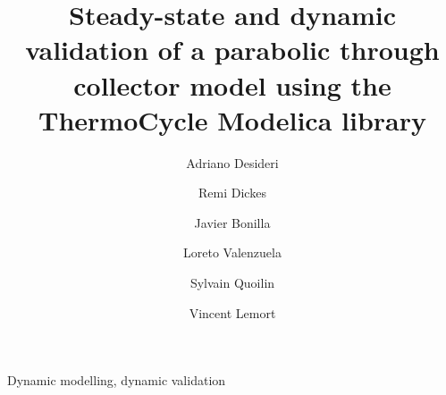 \documentclass[final,3p,times,review]{elsarticle}
\begin{document}
\linenumbers
\modulolinenumbers[1]
\begin{frontmatter}



\title{Steady-state and dynamic validation of a parabolic through collector model using the ThermoCycle Modelica library}


\author[rvt]{Adriano Desideri}
\author[rvt]{Remi Dickes}
\author[focal]{Javier Bonilla}
\author[focal]{Loreto Valenzuela}
\author[rvt]{Sylvain Quoilin}
\author[rvt]{Vincent Lemort}
\address[rvt]{Thermodynamics laboratory, University of Li\`ege,
Campus du Sart Tilman, B49, B-4000 Li\`ege, Belgium}
\address[focal]{PSA-CIEMAT, Plataforma Solar de Almer\' ia - Centro de Investigaciones Energ\' eticas, MedioAmbientales y Tecnológicas, Crta. de Sen\' es s/n, 04200, Tabernas (Almer\' ia), Spain}
%
%
%
%
%
%
%
%
%
\address{}
%
\begin{abstract}

\end{abstract}
%
\begin{keyword}
Dynamic modelling, dynamic validation


\end{keyword}

\end{frontmatter}
\end{document}
